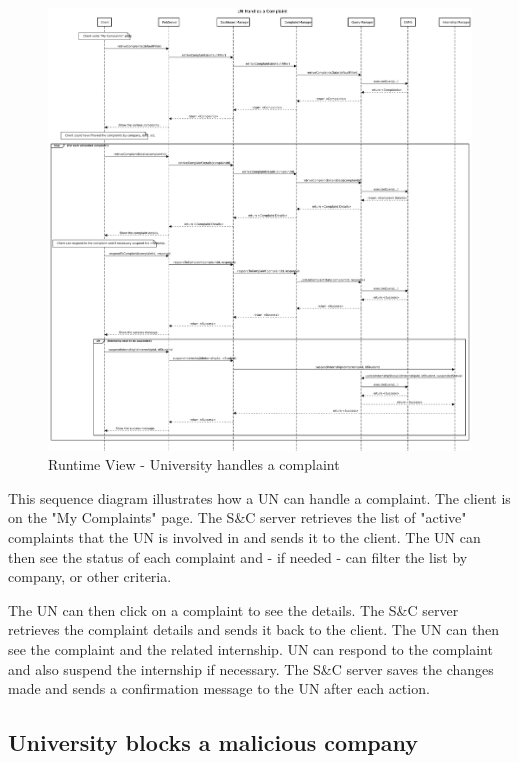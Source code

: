 \begin{figure}[H]
      \centering
      \includegraphics[width=1.0\textwidth]{Images/RV_13.pdf}
      \caption{Runtime View - University handles a complaint}
      \label{fig:rv-un-handles-complaint}
\end{figure}

\par This sequence diagram illustrates how a UN can handle a complaint. The client is on the "My Complaints" page. The
S\&C server retrieves the list of "active" complaints that the UN is involved in and sends it to the client. The UN can
then see the status of each complaint and - if needed - can filter the list by company, or other criteria.

\par The UN can then click on a complaint to see the details. The S\&C server retrieves the complaint details and sends
it back to the client. The UN can then see the complaint and the related internship. UN can respond to the complaint
and also suspend the internship if necessary. The S\&C server saves the changes made and sends a confirmation message
to the UN after each action.

\subsection{University blocks a malicious company}
\label{sub:university-blocks-a-malicious-company}%

